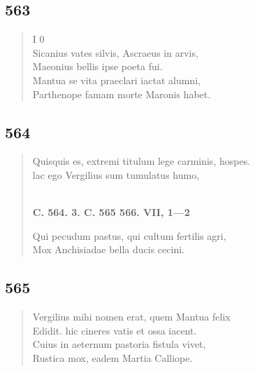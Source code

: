\documentclass[11pt, a4paper]{report}
\begin{document}
            \subsection*{563}
      \begin{verse}
      I 0 \\ Sicanius vates silvis, Ascraeus in arvis, \\ Maeonius bellis ipse poeta fui. \\ Mantua se vita praeclari iactat alumni, \\ Parthenope famam morte Maronis habet. \\ 
      \end{verse}
  
            \subsection*{564}
      \begin{verse}
      Quisquis es, extremi titulum lege carminis, hospes. \\ lac ego Vergilius sum tumulatus humo, \\ 
        ﻿\pagebreak 
    \begin{center} \textbf{C. 564. 3. C. 565 566. VII, 1—2} \end{center} \marginpar{[75]} Qui pecudum pastus, qui cultum fertilis agri, \\ Mox Anchisiadae bella ducis cecini. \\ 
      \end{verse}
  
            \subsection*{565}
      \begin{verse}
      Vergilius mihi nomen erat, quem Mantua felix \\ Edidit. hic cineres vatis et ossa iacent. \\ Cuius in aeternum pastoria fistula vivet, \\ Rustica mox, eadem Martia Calliope. \\ 
      \end{verse}
  
\end{document}
